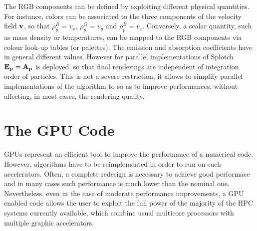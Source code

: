 \documentclass[11pt]{article}
\begin{document}
The RGB components can be defined by exploiting different physical quantities. For instance, colors 
can be associated to the three components of the velocity field $\bf v$, so that 
$\rho_p^{R}=v_x$, $\rho_p^{G}=v_y$ and $\rho_p^{B}=v_z$. Conversely, a scalar quantity, such as mass density or temperatures, can be mapped
to the RGB components via colour look-up tables (or palettes). The emission and absorption coefficients have in general different values. However for parallel implementations of Splotch $\bf{E}_p=\bf{A}_p$ is deployed, so that final renderings are independent of integration order of particles. This is not a severe restriction, it allows to simplify parallel implementations of the algorithm to so as to improve performances, without affecting, in most cases, the rendering quality.%


\section{The GPU Code}
\label{sec:gpu-code}
GPUs represent an efficient tool to improve the performance of a numerical code.
However, algorithms have to be reimplemented in order to run on such accelerators. 
Often, a complete redesign is necessary to achieve good performace and in many
cases such performance is much lower than the nominal one. Nevertheless, even in 
the case of moderate performance improvements, a GPU enabled code allows the 
user to exploit the full power of the majority of the HPC systems currently 
available, which combine usual multicore processors with multiple graphic accelerators.
\end{document}
